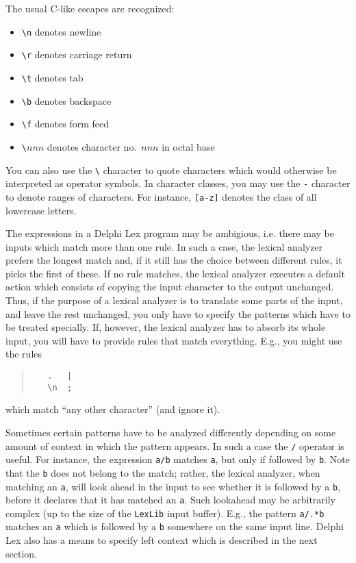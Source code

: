 \documentclass{article}
\begin{document}
The usual C-like escapes are recognized:
\begin{itemize}
   \item \verb"\n"     denotes newline
   \item \verb"\r"     denotes carriage return
   \item \verb"\t"     denotes tab
   \item \verb"\b"     denotes backspace
   \item \verb"\f"     denotes form feed
   \item \verb"\"$nnn$ denotes character no.\ $nnn$ in octal base
\end{itemize}

You can also use the \verb"\" character to quote characters which would
otherwise be interpreted as operator symbols. In character classes, you may
use the \verb"-" character to denote ranges of characters. For instance,
\verb"[a-z]" denotes the class of all lowercase letters.

The expressions in a Delphi Lex program may be ambigious, i.e. there may be inputs
which match more than one rule. In such a case, the lexical analyzer prefers
the longest match and, if it still has the choice between different rules,
it picks the first of these. If no rule matches, the lexical analyzer
executes a default action which consists of copying the input character
to the output unchanged. Thus, if the purpose of a lexical analyzer is
to translate some parts of the input, and leave the rest unchanged, you
only have to specify the patterns which have to be treated specially. If,
however, the lexical analyzer has to absorb its whole input, you will have
to provide rules that match everything. E.g., you might use the rules
\begin{quote}\begin{verbatim}
   .   |
   \n  ;
\end{verbatim}\end{quote}
which match ``any other character'' (and ignore it).

Sometimes certain patterns have to be analyzed differently depending on some
amount of context in which the pattern appears. In such a case the \verb"/"
operator is useful. For instance, the expression \verb"a/b" matches \verb"a",
but only if followed by \verb"b". Note that the \verb"b" does not belong to
the match; rather, the lexical analyzer, when matching an \verb"a", will look
ahead in the input to see whether it is followed by a \verb"b", before it
declares that it has matched an \verb"a". Such lookahead may be arbitrarily
complex (up to the size of the \verb"LexLib" input buffer). E.g., the pattern
\verb"a/.*b" matches an \verb"a" which is followed by a \verb"b" somewhere on
the same input line. Delphi Lex also has a means to specify left context which is
described in the next section.
\end{document}
